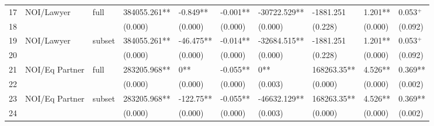\documentclass{article}
\begin{document}
\begin{table}[H]
\begin{tabular}{rlllllllll}
  17 & NOI/Lawyer & full & 384055.261** & -0.849** & -0.001** & -30722.529** & -1881.251 & 1.201** & 0.053$^{+}$ \\ 
  18 &  &  & (0.000) & (0.000) & (0.000) & (0.000) & (0.228) & (0.000) & (0.092) \\ 
  19 & NOI/Lawyer & subset & 384055.261** & -46.475** & -0.014** & -32684.515** & -1881.251 & 1.201** & 0.053$^{+}$ \\ 
  20 &  &  & (0.000) & (0.000) & (0.000) & (0.000) & (0.228) & (0.000) & (0.092) \\ 
  21 & NOI/Eq Partner & full & 283205.968** & 0** & -0.055** & 0** & 168263.35** & 4.526** & 0.369** \\ 
  22 &  &  & (0.000) & (0.000) & (0.000) & (0.003) & (0.000) & (0.000) & (0.002) \\ 
  23 & NOI/Eq Partner & subset & 283205.968** & -122.75** & -0.055** & -46632.129** & 168263.35** & 4.526** & 0.369** \\ 
  24 &  &  & (0.000) & (0.000) & (0.000) & (0.003) & (0.000) & (0.000) & (0.002) \\ 
   \hline
\end{tabular}
\end{table}
\end{document}
